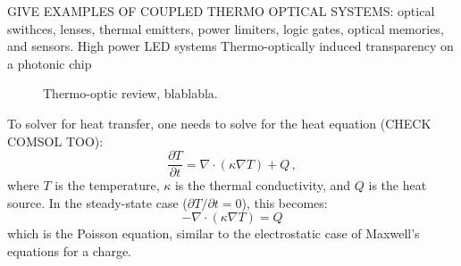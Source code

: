 GIVE EXAMPLES OF COUPLED THERMO OPTICAL SYSTEMS: optical swithces, lenses, thermal emitters,
power limiters, logic gates, optical memories, and sensors.
High power LED systems
Thermo-optically induced transparency on a photonic chip

\begin{figure}[tb]
    \centering

    \caption{Thermo-optic review, blablabla.}
    \label{fig:thermo_opt}
\end{figure}


To solver for heat transfer, one needs to solve for the heat equation (CHECK COMSOL TOO):
\begin{equation}
    \frac{\partial T}{\partial t} = \nabla \cdot (\kappa \nabla T) + Q\,,
\end{equation}
where $T$ is the temperature, $\kappa$ is the thermal conductivity, and $Q$ is the heat source.
In the steady-state case ($\partial T / \partial t = 0$), this becomes:
\begin{equation}
    -\nabla \cdot (\kappa \nabla T) = Q
\end{equation}
which is the Poisson equation, similar to the electrostatic case of Maxwell's equations for a charge.


